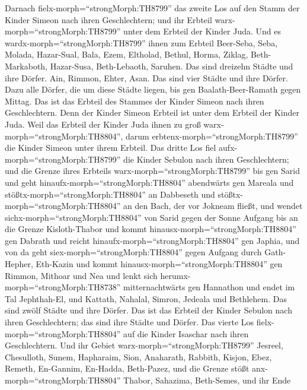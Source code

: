  Darnach fielx-morph=``strongMorph:TH8799'' das zweite Los
auf den Stamm der Kinder Simeon nach ihren Geschlechtern; und ihr
Erbteil warx-morph=``strongMorph:TH8799'' unter dem Erbteil der Kinder
Juda.  Und es wardx-morph=``strongMorph:TH8799'' ihnen zum
Erbteil Beer-Seba, Seba, Molada,  Hazar-Sual, Bala, Ezem,
 Eltholad, Bethul, Horma,  Ziklag,
Beth-Markaboth, Hazar-Susa,  Beth-Lebaoth, Saruhen. Das sind
dreizehn Städte und ihre Dörfer.  Ain, Rimmon, Ehter, Asan.
Das sind vier Städte und ihre Dörfer.  Dazu alle Dörfer, die
um diese Städte liegen, bis gen Baalath-Beer-Ramath gegen Mittag. Das
ist das Erbteil des Stammes der Kinder Simeon nach ihren Geschlechtern.
 Denn der Kinder Simeon Erbteil ist unter dem Erbteil der
Kinder Juda. Weil das Erbteil der Kinder Juda ihnen zu groß
warx-morph=``strongMorph:TH8804'', darum
erbtenx-morph=``strongMorph:TH8799'' die Kinder Simeon unter ihrem
Erbteil.  Das dritte Los fiel
aufx-morph=``strongMorph:TH8799'' die Kinder Sebulon nach ihren
Geschlechtern; und die Grenze ihres Erbteils
warx-morph=``strongMorph:TH8799'' bis gen Sarid  und geht
hinaufx-morph=``strongMorph:TH8804'' abendwärts gen Mareala und
stößtx-morph=``strongMorph:TH8804'' an Dabbeseth und
stößtx-morph=``strongMorph:TH8804'' an den Bach, der vor Jokneam fließt,
 und wendet sichx-morph=``strongMorph:TH8804'' von Sarid
gegen der Sonne Aufgang bis an die Grenze Kisloth-Thabor und kommt
hinausx-morph=``strongMorph:TH8804'' gen Dabrath und reicht
hinaufx-morph=``strongMorph:TH8804'' gen Japhia,  und von
da geht siex-morph=``strongMorph:TH8804'' gegen Aufgang durch
Gath-Hepher, Eth-Kazin und kommt hinausx-morph=``strongMorph:TH8804''
gen Rimmon, Mithoar und Nea  und lenkt sich
herumx-morph=``strongMorph:TH8738'' mitternachtwärts gen Hannathon und
endet im Tal Jephthah-El,  und Kattath, Nahalal, Simron,
Jedeala und Bethlehem. Das sind zwölf Städte und ihre Dörfer.
 Das ist das Erbteil der Kinder Sebulon nach ihren
Geschlechtern; das sind ihre Städte und Dörfer.  Das vierte
Los fielx-morph=``strongMorph:TH8804'' auf die Kinder Isaschar nach
ihren Geschlechtern.  Und ihr Gebiet
warx-morph=``strongMorph:TH8799'' Jesreel, Chesulloth, Sunem,
 Hapharaim, Sion, Anaharath,  Rabbith, Kisjon,
Ebez,  Remeth, En-Gannim, En-Hadda, Beth-Pazez,
 und die Grenze stößt anx-morph=``strongMorph:TH8804''
Thabor, Sahazima, Beth-Semes, und ihr Ende
